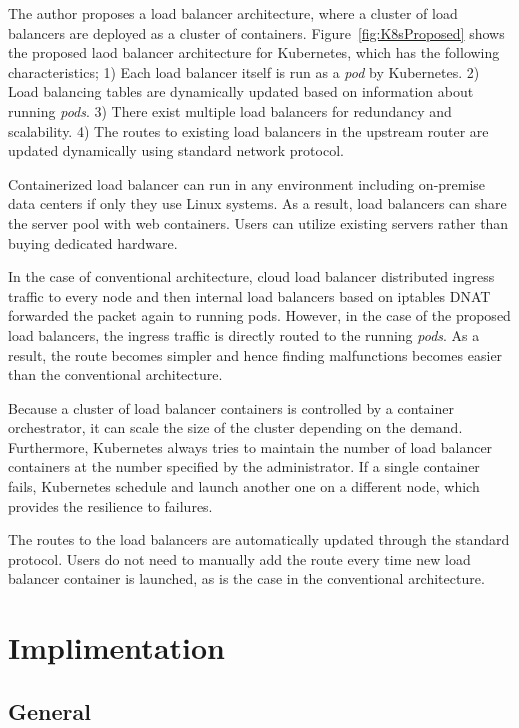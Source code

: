 The author proposes a load balancer architecture, where a cluster of load balancers are deployed as a cluster of containers.
Figure~\ref{fig:K8sProposed} shows the proposed laod balancer architecture for Kubernetes,
which has the following characteristics;
1) Each load balancer itself is run as a {\em pod} by Kubernetes. 
2) Load balancing tables are dynamically updated based on information about running {\em pods}.
3) There exist multiple load balancers for redundancy and scalability.
4) The routes to existing load balancers in the upstream router are updated dynamically using standard network protocol.

Containerized load balancer can run in any environment including on-premise data centers if only they use Linux systems.
As a result, load balancers can share the server pool with web containers.
Users can utilize existing servers rather than buying dedicated hardware.

In the case of conventional architecture, cloud load balancer distributed ingress traffic to every node and then internal load balancers based on iptables DNAT forwarded the packet again to running pods.
However, in the case of the proposed load balancers, the ingress traffic is directly routed to the running {\em pods}.
As a result, the route becomes simpler and hence finding malfunctions becomes easier than the conventional architecture.

Because a cluster of load balancer containers is controlled by a container orchestrator, it can scale the size of the cluster depending on the demand.
Furthermore, Kubernetes always tries to maintain the number of load balancer containers at the number specified by the administrator.
If a single container fails, Kubernetes schedule and launch another one on a different node, which provides the resilience to failures.

The routes to the load balancers are automatically updated through the standard protocol. 
Users do not need to manually add the route every time new load balancer container is launched, as is the case in the conventional architecture.

\FloatBarrier

\section{Implimentation}\label{sec:poc}

\subsection{General}

